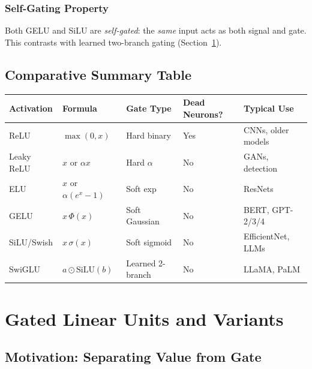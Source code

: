 \documentclass[12pt,a4paper]{article}
\theoremstyle{definition}
\theoremstyle{remark}
\begin{document}
\subsubsection{Self-Gating Property}

Both GELU and SiLU are \emph{self-gated}: the \emph{same} input acts as both signal and gate. This contrasts with learned two-branch gating (Section~\ref{sec:glu}).

\subsection{Comparative Summary Table}

\begin{center}
\renewcommand{\arraystretch}{1.2}
\begin{tabularx}{0.96\textwidth}{@{}>{\raggedright\arraybackslash}p{2.35cm}>{\raggedright\arraybackslash}p{2.6cm}>{\raggedright\arraybackslash}p{2.35cm}>{\centering\arraybackslash}p{1.9cm}>{\raggedright\arraybackslash}X@{}}
\toprule
\textbf{Activation} & \textbf{Formula} & \textbf{Gate Type} & \textbf{Dead Neurons?} & \textbf{Typical Use} \\
\midrule
ReLU        & $\max(0,x)$          & Hard binary    & Yes         & CNNs, older models \\
Leaky ReLU  & $x$ or $\alpha x$    & Hard $\alpha$  & No          & GANs, detection \\
ELU         & $x$ or $\alpha(e^x-1)$ & Soft exp    & No          & ResNets \\
GELU        & $x\,\Phi(x)$         & Soft Gaussian  & No          & BERT, GPT-2/3/4 \\
SiLU/Swish  & $x\,\sigma(x)$       & Soft sigmoid   & No          & EfficientNet, LLMs \\
SwiGLU      & $a\odot\mathrm{SiLU}(b)$ & Learned 2-branch & No    & LLaMA, PaLM \\
\bottomrule
\end{tabularx}
\end{center}

\section{Gated Linear Units and Variants}
\label{sec:glu}

\subsection{Motivation: Separating Value from Gate}
\end{document}
